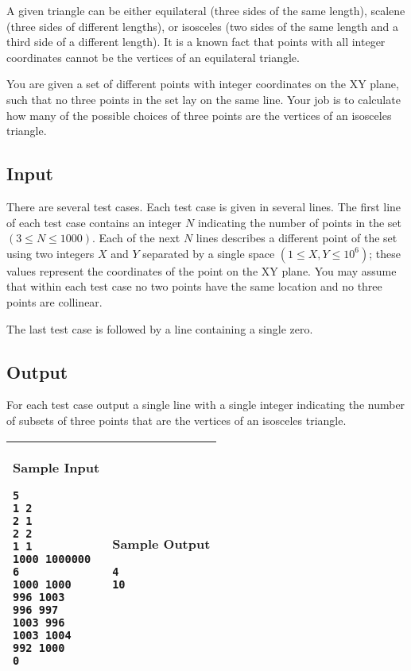 A given triangle can be either equilateral (three sides of the same length),
scalene (three sides of different lengths), or isosceles (two sides of the
same length and a third side of a different length). It is a known fact
that points with all integer coordinates cannot be the vertices of an
equilateral triangle.

You are given a set of different points with integer coordinates on the XY
plane, such that no three points in the set lay on the same line. Your job
is to calculate how many of the possible choices of three points are the
vertices of an isosceles triangle.

\subsection*{Input}

There are several test cases. Each test case is given in several lines. The
first line of each test case contains an integer $N$ indicating the number
of points in the set $(3 \leq N  \leq 1000)$. Each of the next $N$ lines
describes a different point of the set using two integers $X$ and $Y$
separated by a single space $(1 \leq X, Y \leq 10^6)$; these values
represent the coordinates of the point on the XY plane. You may assume that
within each test case no two points have the same location and no three
points are collinear.

The last test case is followed by a line containing a single zero.

\subsection*{Output}

For each test case output a single line with a single integer indicating the
number of subsets of three points that are the vertices of an isosceles
triangle.

\begin{table}[!h]
\centering
\begin{tabular}{|l|l|}
\hline
\begin{minipage}[t]{3in}
\textbf{Sample Input}
\begin{verbatim}
5
1 2
2 1
2 2
1 1
1000 1000000
6
1000 1000
996 1003
996 997
1003 996
1003 1004
992 1000
0
\end{verbatim}
\vspace{1mm}
\end{minipage}
&

\begin{minipage}[t]{3in}
\textbf{Sample Output}
\begin{verbatim}
4
10
\end{verbatim}
\vspace{1mm}
\end{minipage} \\
\hline
\end{tabular}
\end{table}

\newpage
